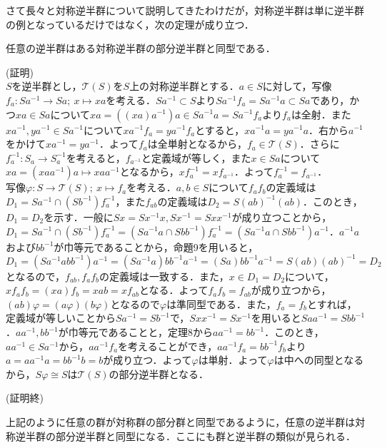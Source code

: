 さて長々と対称逆半群について説明してきたわけだが，対称逆半群は単に逆半群の例となっているだけではなく，次の定理が成り立つ．
\begin{sthm}
任意の逆半群はある対称逆半群の部分逆半群と同型である．
\end{sthm}
(証明)\\
$S$を逆半群とし，${\mathscr T}(S)$を$S$上の対称逆半群とする．$a\in S$に対して，写像$f_a:Sa^{-1}\rightarrow Sa;\:x\mapsto xa$を考える．$Sa^{-1}\subset S$より$Sa^{-1}f_a=Sa^{-1}a\subset Sa$であり，かつ$xa\in Sa$について$xa=((xa)a^{-1})a\in Sa^{-1}a=Sa^{-1}f_a$より$f_a$は全射．また$xa^{-1},ya^{-1}\in Sa^{-1}$について$xa^{-1}f_a=ya^{-1}f_a$とすると，$xa^{-1}a=ya^{-1}a$．右から$a^{-1}$をかけて$xa^{-1}=ya^{-1}$．よって$f_a$は全単射となるから，$f_a\in{\mathscr T}(S)$．さらに$f_a^{-1}:S_a\rightarrow S_a^{-1}$を考えると，$f_{a^{-1}}$と定義域が等しく，また$x\in Sa$について$xa=(xaa^{-1})a\mapsto xaa^{-1}$となるから，$xf_a^{-1}=xf_{a^{-1}}$．よって$f_a^{-1}=f_{a^{-1}}$．\\
写像$\varphi:S\rightarrow{\mathscr T}(S);\:x\mapsto f_a$を考える．$a,b\in S$について$f_af_b$の定義域は$D_1=Sa^{-1}\cap (Sb^{-1})f_a^{-1}$，また$f_{ab}$の定義域は$D_2=S(ab)^{-1}(ab)$．このとき，$D_1=D_2$を示す．一般に$Sx=Sx^{-1}x,Sx^{-1}=Sxx^{-1}$が成り立つことから，$D_1=Sa^{-1}\cap (Sb^{-1})f_a^{-1}=(Sa^{-1}a\cap Sbb^{-1})f_a^{-1}=(Sa^{-1}a\cap Sbb^{-1})a^{-1}$．$a^{-1}a$および$bb^{-1}$が巾等元であることから，命題9を用いると，$D_1=(Sa^{-1}abb^{-1})a^{-1}=(Sa^{-1}a)bb^{-1}a^{-1}=(Sa)bb^{-1}a^{-1}=S(ab)(ab)^{-1}=D_2$となるので，$f_{ab},f_af_b$の定義域は一致する．また，$x\in D_1=D_2$について，
$xf_af_b=(xa)f_b=xab=xf_{ab}$となる．よって$f_af_b=f_{ab}$が成り立つから，$(ab)\varphi=(a\varphi)(b\varphi)$となるので$\varphi$は準同型である．また，$f_a=f_b$とすれば，定義域が等しいことから$Sa^{-1}=Sb^{-1}$で，$Sxx^{-1}=Sx^{-1}$を用いると$Saa^{-1}=Sbb^{-1}$．$aa^{-1},bb^{-1}$が巾等元であることと，定理8から$aa^{-1}=bb^{-1}$．このとき，$aa^{-1}\in Sa^{-1}$から，$aa^{-1}f_a$を考えることができ，$aa^{-1}f_a=bb^{-1}f_b$より$a=aa^{-1}a=bb^{-1}b=b$が成り立つ．よって$\varphi$は単射．よって$\varphi$は中への同型となるから，$S\varphi\cong S$は${\mathscr T}(S)$の部分逆半群となる．
\begin{flushright}
(証明終)
\end{flushright}
上記のように任意の群が対称群の部分群と同型であるように，任意の逆半群は対称逆半群の部分逆半群と同型になる．ここにも群と逆半群の類似が見られる．
